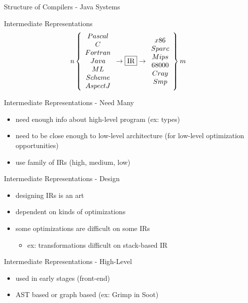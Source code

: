\documentclass[mcgill,slideColor,colorBG,pdf]{prosper}
\begin{document}
\begin{slide} {Structure of Compilers - Java Systems}
\end{slide}

\begin{slide} {Intermediate Representations}
$$n\left\{ \begin{array}{c} Pascal\\C\\Fortran\\Java\\ML\\Scheme\\AspectJ \end{array} \rightarrow \fbox{IR} \rightarrow \begin{array}{c} x86\\Sparc\\Mips\\68000\\Cray\\Smp \end{array}\right\} m$$
\end{slide}

\begin{slide} {Intermediate Representations - Need Many}
\begin{itemize}
\item need enough info about high-level program (ex: types)
\item need to be close enough to low-level architecture (for low-level optimization opportunities)
\item use family of IRs (high, medium, low)
\end{itemize}
\end{slide}

\begin{slide} {Intermediate Representations - Design}
\begin{itemize}
\item designing IRs is an art
\item dependent on kinds of optimizations
\item some optimizations are difficult on some IRs
\begin{itemize}
\item ex: transformations difficult on stack-based IR
\end{itemize}
\end{itemize}
\end{slide}

\begin{slide} {Intermediate Representations - High-Level}
\begin{itemize}
\item used in early stages (front-end)
\item AST based or graph based (ex: Grimp in Soot)
\end{itemize}
\end{slide}
\end{document}
